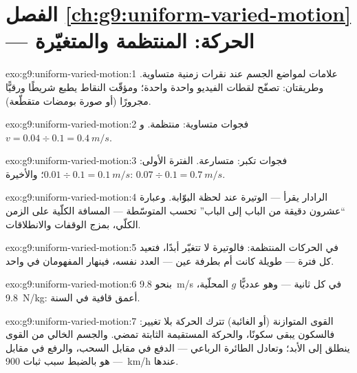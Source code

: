 \section*{الفصل \ref{ch:g9:uniform-varied-motion} --- الحركة: المنتظمة والمتغيّرة}

\begin{solution}{exo:g9:uniform-varied-motion:1}
علامات لمواضع الجسم عند نقرات زمنية متساوية. وطريقتان: تصفّح
لقطات الفيديو واحدة واحدة؛ ومؤقّت النقاط يطبع شريطًا ورقيًّا
مجرورًا (أو صورة بومضات متقطّعة).
\end{solution}

\begin{solution}{exo:g9:uniform-varied-motion:2}
فجوات متساوية: منتظمة. و$v = 0.04 \div 0.1 = \qty{0.4}{m/s}$.
\end{solution}

\begin{solution}{exo:g9:uniform-varied-motion:3}
فجوات تكبر: متسارعة. الفترة الأولى: $0.01 \div 0.1 =
\qty{0.1}{m/s}$؛ والأخيرة: $0.07 \div 0.1 = \qty{0.7}{m/s}$.
\end{solution}

\begin{solution}{exo:g9:uniform-varied-motion:4}
الرادار يقرأ  --- الوتيرة عند لحظة البوّابة.
وعبارة ``عشرون دقيقة من الباب إلى الباب'' تحسب المتوسّطة ---
المسافة الكلّية على الزمن الكلّي، بمزج الوقفات والانطلاقات.
\end{solution}

\begin{solution}{exo:g9:uniform-varied-motion:5}
في الحركات المنتظمة: فالوتيرة لا تتغيّر أبدًا، فتعيد كل فترة
--- طويلة كانت أم بطرفة عين --- العدد نفسه، فينهار المفهومان
في واحد.
\end{solution}

\begin{solution}{exo:g9:uniform-varied-motion:6}
بنحو \qty{9.8}{m/s} في كل ثانية --- وهو عدديًّا $g$ المحلّية،
\qty{9.8}{N/kg}: أعمق قافية في السنة.
\end{solution}

\begin{solution}{exo:g9:uniform-varied-motion:7}
القوى المتوازنة (أو الغائبة) تترك الحركة بلا تغيير: فالسكون
يبقى سكونًا، والحركة المستقيمة الثابتة تمضي. والجسم الخالي من
القوى ينطلق إلى الأبد؛ وتعادل الطائرة الرباعي --- الدفع في
مقابل السحب، والرفع في مقابل  --- هو بالضبط سبب ثبات
\qty{900}{km/h} عندها.
\end{solution}

